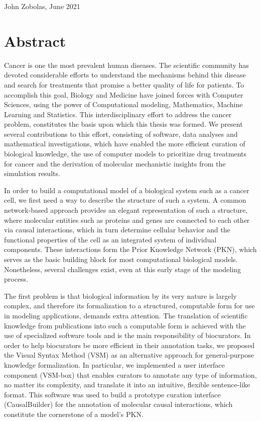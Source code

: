 \documentclass[
  12pt,
]{book}
\newenvironment{right-align}{
  \begin{flushright}}
 {\end{flushright}}
\begin{document}
\begin{right-align}
John Zobolas,
June 2021

\end{right-align}

\hypertarget{abstract}{%
\chapter*{Abstract}\label{abstract}}

\vspace{-30pt}

\indent

Cancer is one the most prevalent human diseases.
The scientific community has devoted considerable efforts to understand the mechanisms behind this disease and search for treatments that promise a better quality of life for patients.
To accomplish this goal, Biology and Medicine have joined forces with Computer Sciences, using the power of Computational modeling, Mathematics, Machine Learning and Statistics.
This interdisciplinary effort to address the cancer problem, constitutes the basis upon which this thesis was formed.
We present several contributions to this effort, consisting of software, data analyses and mathematical investigations, which have enabled the more efficient curation of biological knowledge, the use of computer models to prioritize drug treatments for cancer and the derivation of molecular mechanistic insights from the simulation results.

In order to build a computational model of a biological system such as a cancer cell, we first need a way to describe the structure of such a system.
A common network-based approach provides an elegant representation of such a structure, where molecular entities such as proteins and genes are connected to each other via causal interactions, which in turn determine cellular behavior and the functional properties of the cell as an integrated system of individual components.
These interactions form the Prior Knowledge Network (PKN), which serves as the basic building block for most computational biological models. Nonetheless, several challenges exist, even at this early stage of the modeling process.

The first problem is that biological information by its very nature is largely complex, and therefore its formalization to a structured, computable form for use in modeling applications, demands extra attention.
The translation of scientific knowledge from publications into such a computable form is achieved with the use of specialized software tools and is the main responsibility of biocurators.
In order to help biocurators be more efficient in their annotation tasks, we proposed the Visual Syntax Method (VSM) as an alternative approach for general-purpose knowledge formalization.
In particular, we implemented a user interface component (VSM-box) that enables curators to annotate any type of information, no matter its complexity, and translate it into an intuitive, flexible sentence-like format.
This software was used to build a prototype curation interface (CausalBuilder) for the annotation of molecular causal interactions, which constitute the cornerstone of a model's PKN.
\end{document}
